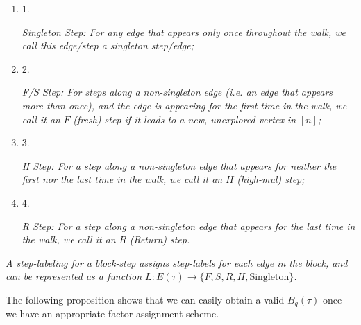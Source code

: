 \documentclass[10pt,a4paper]{article}
\begin{document}
\begin{enumerate}


\item[] 
1. 


\emph{Singleton Step}\emph{: For any edge that appears only once throughout the walk, we call this edge/step a singleton step/edge;}\par





\item[] 
2. 


\emph{F/S Step}\emph{: For steps along a non-singleton edge (i.e. an edge that appears more than once), and the edge is appearing for the first time in the walk, we call it an }$F$\emph{ (fresh) step if it leads to a new, unexplored vertex in }$[n]$\emph{;}\par





\item[] 
3. 


\emph{H Step}\emph{: For a step along a non-singleton edge that appears for neither the first nor the last time in the walk, we call it an }$H$\emph{ (high-mul) step;}\par





\item[] 
4. 


\emph{R Step}\emph{: For a step along a non-singleton edge that appears for the last time in the walk, we call it an }$R$\emph{ (Return) step.}\par





\end{enumerate}


\emph{A step-labeling for a block-step assigns step-labels for each edge in the block, and can be represented as a function $L:E(\tau)\rightarrow\{F,S,R,H,\text{Singleton}\}$.}\par






The following proposition shows that we can easily obtain a valid $B_{q}(\tau)$ once we have an appropriate factor assignment scheme.\par
\end{document}
